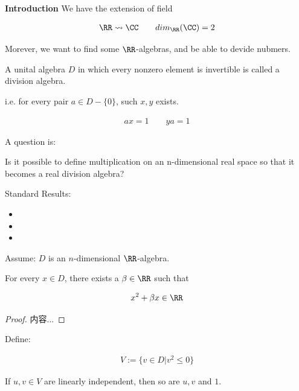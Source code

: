 \documentclass[Total.tex]{subfiles}
\begin{document}
	\textbf{Introduction} We have the extension of field
	
	\begin{gather*}
		\RR\rightsquigarrow \CC\qquad dim_\RR(\CC)=2
	\end{gather*}
	
	Morever, we want to find some $\RR$-algebras, and be able to devide nubmers. 
	
	\begin{Def}
		A unital algebra $D$ in which every nonzero element is invertible
		is called a division algebra. 
		
		i.e. for every pair $a\in D-\{0\}$, such $x,y$ exists.
		
		\begin{gather*}
			ax=1\qquad ya=1
		\end{gather*}
	\end{Def}
	
	A question is:
	
	\begin{center}
		Is it possible to define multiplication on an n-dimensional real space so
		that it becomes a real division algebra? 
	\end{center}
	
	Standard Results:
	
	\begin{itemize}
		\item 
		\item 
		\item 
	\end{itemize}
	
	Assume: $D$ is an $n$-dimensional $\RR$-algebra.
	
	\begin{lemma}
		For every $x\in D$, there exists a $\beta\in \RR$ such that
		
		\begin{gather*}
			x^2+\beta x\in \RR
		\end{gather*}
	\end{lemma}
	
	\begin{proof}
		内容...
	\end{proof}
	
	Define:
	
	\begin{gather*}
		V:=\{v\in D|v^2\leq 0\}
	\end{gather*}
	
	
	
	\begin{lemma}
		If $u,v\in V$ are linearly independent, then so are $u,v$ and $1$.
	\end{lemma}
	
\end{document}

